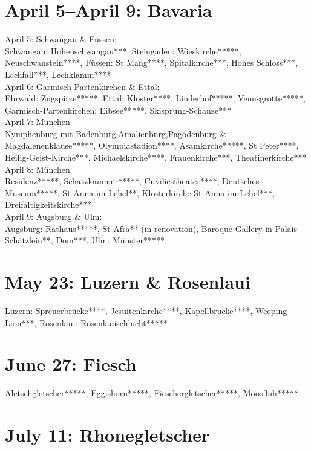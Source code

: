 \section{April 5--April 9: Bavaria}
\label{2010:Bavaria}

April 5: Schwangau \& F\"ussen:\\
Schwangau: Hohenschwangau***, Steingaden: Wieskirche*****, Neuschwanstein****, F\"ussen: St Mang****, Spitalkirche***, Hohes Schloss***, Lechfall***, Lechklamm****\\

April 6: Garmisch-Partenkirchen \& Ettal:\\
Ehrwald: Zugspitze*****, Ettal: Kloster****, Linderhof*****, Venusgrotte*****, Garmisch-Partenkirchen: Eibsee*****, Skisprung-Schanze***\\

April 7: M\"unchen\\
Nymphenburg mit Badenburg,Amalienburg,Pagodenburg \& Magdalenenklause*****, Olympiastadion****, Asamkirche*****, St Peter****, Heilig-Geist-Kirche***, Michaelskirche****, Frauenkirche***, Theatinerkirche***\\

April 8: M\"unchen\\
Residenz*****, Schatzkammer*****, Cuviliestheater****, Deutsches Museum*****, St Anna im Lehel**, Klosterkirche St Anna im Lehel***, Dreifaltigkeitskirche***\\

April 9: Augsburg \& Ulm:\\
Augsburg: Rathaus*****, St Afra** (in renovation), Baroque Gallery in Palais Sch\"atzlein**, Dom***, Ulm: M\"unster*****

\section{May 23: Luzern \& Rosenlaui}
\label{2010:Luzern}

Luzern: Spreuerbr\"ucke****, Jesuitenkirche****, Kapellbr\"ucke****, Weeping Lion***, Rosenlaui: Rosenlauischlucht*****

\section{June 27: Fiesch}
\label{Fiesch2010}

Aletschgletscher*****, Eggishorn*****, Fieschergletscher*****, Moosfluh*****

\section{July 11: Rhonegletscher}
\label{Rhonegletscher2010}

